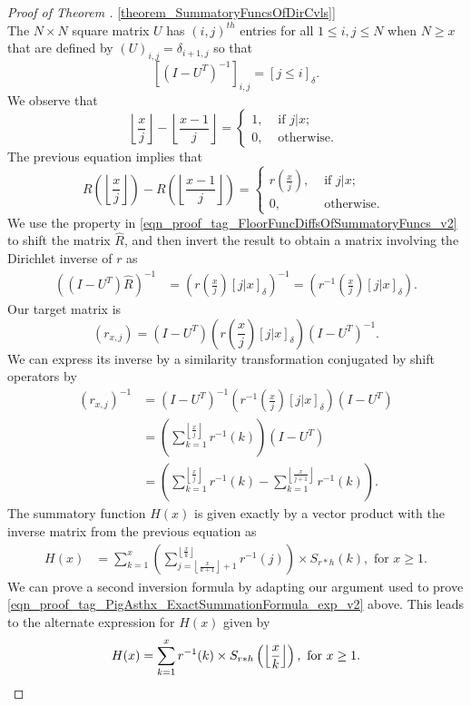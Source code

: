 \documentclass[11pt,reqno,a4letter]{article}
\newcommand{\hlocalref}[1]{\hyperref[#1]{\ref{#1}}}
\numberwithin{equation}{section}
\numberwithin{figure}{section}
\numberwithin{table}{section}
\newcommand{\Iverson}[1]{\ensuremath{\left[#1\right]_{\delta}}}
\newcommand{\floor}[1]{\left\lfloor #1 \right\rfloor}
\newcommand{\Floor}[2]{\ensuremath{\left\lfloor \frac{#1}{#2} \right\rfloor}}
\theoremstyle{plain}
\numberwithin{theorem}{section}
\theoremstyle{definition}
\begin{document}
\begin{proof}[Proof of Theorem \hlocalref{theorem_SummatoryFuncsOfDirCvls}]
\[\]
The $N \times N$ square matrix $U$ 
has $(i,j)^{th}$ entries for all $1 \leq i,j \leq N$ when $N \geq x$ that are defined by 
$(U)_{i,j} = \delta_{i+1,j}$ so that 
\[
\left[\left(I - U^T\right)^{-1}\right]_{i,j} = \Iverson{j \leq i}. 
\]
We observe that 
\[
\Floor{x}{j} - \Floor{x-1}{j} = \begin{cases} 
     1, & \text{ if $j|x$; } \\ 
     0, & \text{ otherwise. } 
     \end{cases} 
\] 
The previous equation implies that 
\begin{equation} 
\label{eqn_proof_tag_FloorFuncDiffsOfSummatoryFuncs_v2} 
R\left(\floor{\frac{x}{j}}\right) - R\left(\floor{\frac{x-1}{j}}\right) = 
     \begin{cases} 
     r\left(\frac{x}{j}\right), & \text{ if $j | x$; } \\ 
     0, & \text{ otherwise. } 
     \end{cases}
\end{equation} 
We use the property in \eqref{eqn_proof_tag_FloorFuncDiffsOfSummatoryFuncs_v2} 
to shift the matrix $\hat{R}$, and then invert the result to obtain a matrix involving the 
Dirichlet inverse of $r$ as 
\begin{align*} 
\left(\left(I-U^{T}\right) \hat{R}\right)^{-1} & = 
     \left(r\left(\frac{x}{j}\right) \Iverson{j|x}\right)^{-1} = 
     \left(r^{-1}\left(\frac{x}{j}\right) \Iverson{j|x}\right). 
\end{align*} 
Our target matrix is 
$$(r_{x,j}) = \left(I-U^{T}\right) \left(r\left(\frac{x}{j}\right) \Iverson{j|x}\right) \left(I-U^{T}\right)^{-1}.$$
We can express its inverse by a similarity transformation conjugated by shift operators by 
\begin{align*} 
(r_{x,j})^{-1} & = \left(I-U^{T}\right)^{-1} \left(r^{-1}\left(\frac{x}{j}\right) 
     \Iverson{j|x}\right) \left(I-U^{T}\right) \\ 
     & = \left(\sum_{k=1}^{\floor{\frac{x}{j}}} r^{-1}(k)\right) \left(I-U^{T}\right) \\ 
     & = \left(\sum_{k=1}^{\floor{\frac{x}{j}}} r^{-1}(k) - \sum_{k=1}^{\floor{\frac{x}{j+1}}} r^{-1}(k)\right). 
\end{align*} 
The summatory function $H(x)$ is given exactly 
by a vector product with the inverse matrix from the previous equation as 
\begin{align*} 
H(x) & = \sum_{k=1}^x \left(\sum_{j=\floor{\frac{x}{k+1}}+1}^{\floor{\frac{x}{k}}} r^{-1}(j)\right) 
	\times S_{r \ast h}(k), \text{ for } x \geq 1. 
\end{align*} 
We can prove a second inversion formula by adapting our argument used to prove 
\eqref{eqn_proof_tag_PigAsthx_ExactSummationFormula_exp_v2} above. 
This leads to the alternate expression for $H(x)$ given by 
\[
H(x) = \sum_{k=1}^{x} r^{-1}(k) \times S_{r \ast h}\left(\Floor{x}{k}\right), 
     \text{ for } x \geq 1. 
     \qedhere 
\]
\end{proof} 
\end{document}
